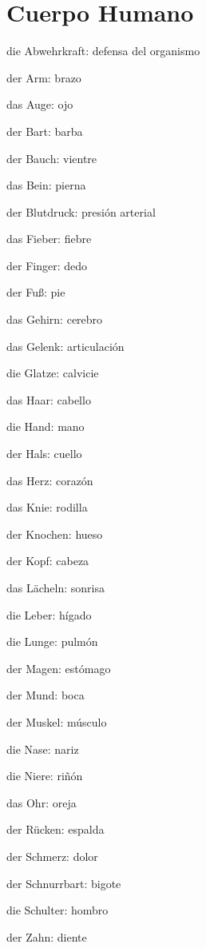 \section{Cuerpo Humano}
\begin{multicols}{3}
\begin{myitemize}
\item die Abwehrkraft: defensa del organismo
\item der Arm: brazo
\item das Auge: ojo
\item der Bart: barba
\item der Bauch: vientre
\item das Bein: pierna
\item der Blutdruck: presión arterial
\item das Fieber: fiebre
\item der Finger: dedo
\item der Fuß: pie
\item das Gehirn: cerebro
\item das Gelenk: articulación
\item die Glatze: calvicie
\item das Haar: cabello
\item die Hand: mano
\item der Hals: cuello
\item das Herz: corazón
\item das Knie: rodilla
\item der Knochen: hueso
\item der Kopf: cabeza
\item das Lächeln: sonrisa
\item die Leber: hígado
\item die Lunge: pulmón
\item der Magen: estómago
\item der Mund: boca
\item der Muskel: músculo
\item die Nase: nariz
\item die Niere: riñón
\item das Ohr: oreja
\item der Rücken: espalda
\item der Schmerz: dolor
\item der Schnurrbart: bigote
\item die Schulter: hombro
\item der Zahn: diente
\end{myitemize}
\end{multicols}


